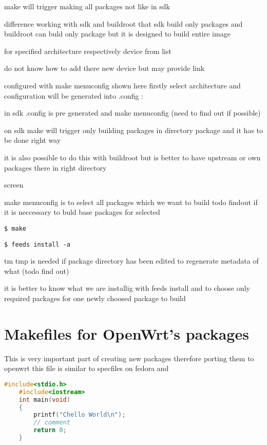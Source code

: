 make will trigger making all packages not like in sdk

difference working with sdk and buildroot that sdk build only packages and buildroot can buld only package but it is designed to build entire image

for specified architecture respectively device from list

do not know how to add there new device but may provide link

configured with make menuconfig shown here firstly select architecture and configuration will be generated into .config :

in sdk .config is pre generated and make menuconfig (need to find out if possible)

on sdk make will trigger only building packages in directory package and it has to be done right way

it is also possible to do this with buildroot but is better to have upstream or own packages there in right directory

screen

make menuconfig is to select all packages which we want to build  todo findout if it is neccessary to buld base packages for selected

{\tt \$ make}

{\tt \$ feeds install -a}

tm tmp is needed if package directory has been edited to regenerate metadata of what (todo find out)

it is better to know what we are installig with feeds install and to choose only required packages for one newly choosed package to build

\section{Makefiles for OpenWrt's packages}

This is very important part of creating new packages therefore porting them to openwrt this file is similar to specfiles on fedora and

\begin{lstlisting}[language=c,basicstyle=\ttfamily\footnotesize,label=c,caption=Basic C code.]
    #include<stdio.h>
    #include<iostream>
    int main(void)
    {
        printf("Chello World\n");
        // comment
        return 0;
    }
\end{lstlisting}
